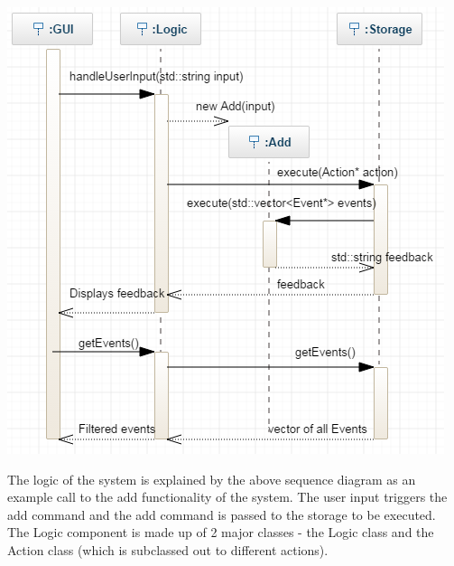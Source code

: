\documentclass[12pt]{extarticle}
\begin{document}
\includegraphics[width=\textwidth, height = \textheight / 2 - 1cm]{add_call_diagram}

\newpage

The logic of the system is explained by the above sequence diagram as an example call to the add functionality of the system. The user input triggers the add command and the add command is passed to the storage to be executed.\\
The Logic component is made up of 2 major classes - the Logic class and the Action class (which is subclassed out to different actions).
\end{document}
